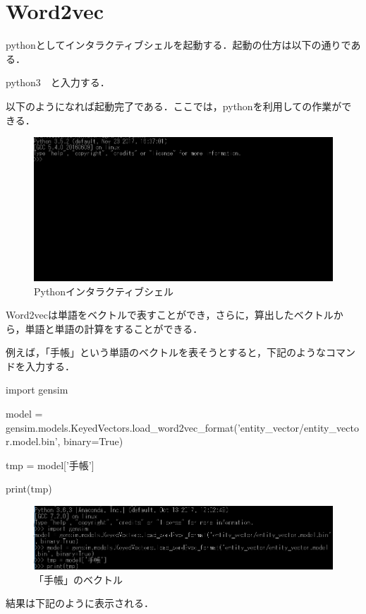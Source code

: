 \section{Word2vec}

pythonとしてインタラクティブシェルを起動する．起動の仕方は以下の通りである．

python3　と入力する．

以下のようになれば起動完了である．ここでは，pythonを利用しての作業ができる．

\begin{figure}[htb]
\centering
\includegraphics[width=13cm]{4-28.png}
\caption{Pythonインタラクティブシェル}\label{4-28}
\end{figure}
\newpage

Word2vecは単語をベクトルで表すことができ，さらに，算出したベクトルから，単語と単語の計算をすることができる．

例えば，「手帳」という単語のベクトルを表そうとすると，下記のようなコマンドを入力する．

import gensim

model = gensim.models.KeyedVectors.load\_word2vec\_format('entity\_vector/entity\_vector.model.bin', binary=True)

tmp = model['手帳']

print(tmp)

\begin{figure}[htb]
\centering
\includegraphics[width=13cm]{4-29.png}
\caption{「手帳」のベクトル}\label{4-29}
\end{figure}
\newpage

結果は下記のように表示される．

